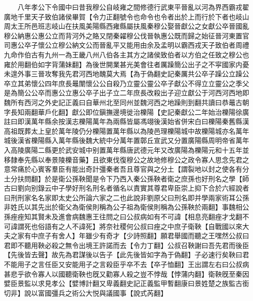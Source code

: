 　　八年孝公下令國中曰昔我穆公自岐雍之間修德行武東平晉亂以河為界西霸戎翟廣地千里天子致伯諸侯畢賀【令力正翻號令也命令也令者出於上而行於下者也岐山周太王所邑班志岐山在扶風美陽縣西雍縣屬扶風秦穆公娶晉獻公之女獻公卒晉國亂穆公納惠公惠公立而背河外之賂又閉秦糴穆公伐晉執惠公既而歸之始征晉河東置官司惠公卒子懷公立穆公納文公而晉亂平又能用由余及孟明以霸西戎天子致伯者周禮九命作伯古有九州一為王畿八州八伯各主其方之諸侯致伯者以方伯之任致之穆公也雍於用翻伯如字背蒲妹翻】為後世開業甚光美會往者厲躁簡公出子之不寜國家内憂未遑外事三晉攻奪我先君河西地醜莫大焉【為于偽翻史記秦厲共公卒子躁公立躁公卒立其弟懷公四年庶長鼂闈懷公公自殺乃立靈公靈公卒子獻公不得立立靈公之季父是為簡公公卒而惠公立惠公卒子出子立二年庶長改殺出子迎立獻公于河西河西地即魏所有西河之外史記正義曰自華州北至同州並魏河西之地躁則到翻共讀曰恭鼂古朝字長知兩翻華戶化翻】獻公即位鎭撫邊境徙治櫟陽【史記秦獻公二年始治櫟陽徐廣註曰即漢萬年縣余按漢志櫟陽萬年為兩縣皆屬馮翊後漢始省併宋白曰櫟陽秦舊縣漢高祖既葬太上皇於萬年陵仍分櫟陽置萬年縣以為陵邑理櫟陽城中故櫟陽城亦名萬年城後漢省櫟陽縣入萬年縣後魏大統中分萬年置鄣丘宣武又分置廣陽縣周明帝省萬年入高陵廣陽二縣更於武安城中别置萬年縣唐武德元年又改廣陽為櫟陽元和十五年並移隸奉先縣以奉景陵櫟音藥】且欲東伐復穆公之故地修穆公之政令寡人思念先君之意常痛於心賓客羣臣有能出奇計彊秦者吾且尊官與之分土【謂裂地以封之使各有分土分扶問翻】於是衛公孫鞅聞是令下乃西入秦公孫鞅者衛之庶孫也好刑名之學【師古曰劉向别錄云中子學好刑名刑名者循名以責實其尊君卑臣崇上抑下合於六經說者曰刑刑家名名家即太史公所論六家之二也此說非劉原父曰刑名即并學兩家術耳公孫非姓氏以其先出於衛父為衛侯則稱為公子祖為衛侯則稱為公孫鞅於兩翻】事魏相公孫痤痤知其賢未及進會病魏惠王往問之曰公叔病如有不可諱【相息亮翻痤才戈翻不可諱謂死也俗語有之人不諱死】將奈社稷何公叔曰痤之中庶子衛鞅【自戰國以來大夫之家有中庶子有舍人】年雖少有奇才【少詩照翻】願君舉國而聽之王嘿然公叔曰君即不聽用鞅必殺之無令出境王許諾而去【令力丁翻】公叔召鞅謝曰吾先君而後臣【先後皆去聲】故先為君謀後以告子【此先後皆如字為于偽翻】子必速行矣鞅曰君不能用子之言任臣又安能用子之言殺臣乎卒不去【卒子恤翻】王出謂左右曰公叔病甚悲乎欲令寡人以國聽衛鞅也旣又勸寡人殺之豈不悖哉【悖蒲内翻】衛鞅旣至秦因嬖臣景監以求見孝公【嬖博計翻又卑義翻史記正義監甲暫翻康曰景姓楚之族監古銜切非】說以富國彊兵之術公大悦與議國事【說式芮翻】

